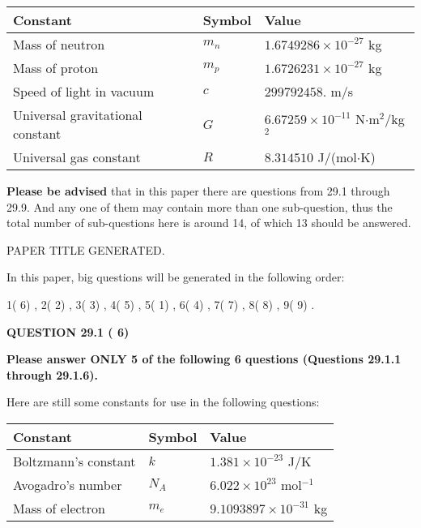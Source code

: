 \documentclass[12pt]{article}
\begin{document}
 
\noindent\begin{tabular}{|l|l|l|}
\hline
Constant & Symbol & Value \\
\hline
Mass of neutron &
$m_n$ &
 $ 1.6749286 \times 10^{-27} $
kg \\
\hline
Mass of proton &
$m_p$ &
 $ 1.6726231 \times 10^{-27} $
kg \\
\hline
Speed of light in vacuum &
$c$ &
 $ 299792458. $
m/s \\
\hline
Universal gravitational constant &
$G$ &
 $ 6.67259 \times 10^{-11} $
N$\cdot $m$^2$/kg$^2$ \\
\hline
Universal gas constant &
$R$ &
 $ 8.314510 $
J/(mol$\cdot $K) \\
\hline
\end{tabular}
 
 
{\textbf{\large{Please be advised}}} that in this paper there are questions from
29.1 through
29.9.
And any one of them may contain more than one sub-question, thus the total number
of sub-questions here is around 14, of which
13 should be answered.
 
\vspace{0.3in}
 
 
   
   
 PAPER TITLE GENERATED.
   
   
   
\vspace{0.2in}
   
In this paper, big questions will be generated in the following order: 
   
   
            1(          6)
 ,
            2(          2)
 ,
            3(          3)
 ,
            4(          5)
 ,
            5(          1)
 ,
            6(          4)
 ,
            7(          7)
 ,
            8(          8)
 ,
            9(          9)
 .
  
\vspace{0.2in}
  
{\textbf{\Large{QUESTION
29.1 
 (          6)
}}}
  
  
 
{\textbf{\Large{Please answer ONLY
5 of the following
6 questions (Questions
29.1.1 through
29.1.6). }}}
 
Here are still some constants for use in the following questions:
 
 
\noindent\begin{tabular}{|l|l|l|}
\hline
Constant & Symbol & Value \\
\hline
 
Boltzmann's constant &
$k$ &
 $ 1.381 \times 10^{-23} $
J/K \\
\hline
 
Avogadro's number &
$N_A$ &
 $ 6.022 \times 10^{23} $
mol$^{-1}$ \\
\hline
 
Mass of electron &
$m_e$ &
 $ 9.1093897 \times 10^{-31} $
kg \\
\hline
 
\end{tabular}
 
\end{document}

